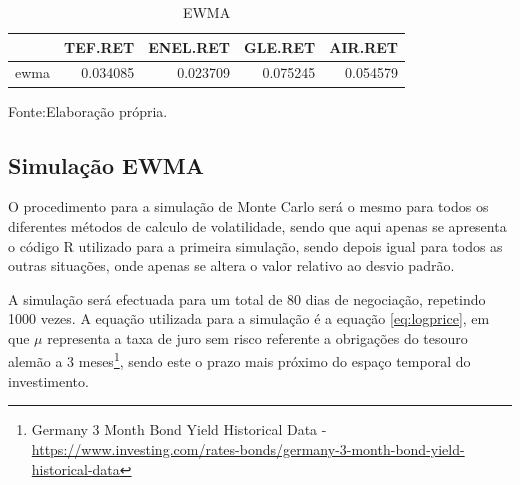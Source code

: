 \documentclass[
  12pt,
  a4paper,
  openany]{book}
\begin{document}
\begin{table}[!h]

\caption{\label{tab:ewmaval}EWMA}
\centering
\begin{tabular}[t]{lrrrr}
\toprule
  & TEF.RET & ENEL.RET & GLE.RET & AIR.RET\\
\midrule
ewma & 0.034085 & 0.023709 & 0.075245 & 0.054579\\
\bottomrule
\end{tabular}
\end{table}
\FloatBarrier
\centering

Fonte:Elaboração própria.

\justifying
\bigskip

\hypertarget{simulauxe7uxe3o-ewma}{%
\subsection{Simulação EWMA}\label{simulauxe7uxe3o-ewma}}

O procedimento para a simulação de Monte Carlo será o mesmo para todos os diferentes métodos de calculo de volatilidade, sendo que aqui apenas se apresenta o código R utilizado para a primeira simulação, sendo depois igual para todos as outras situações, onde apenas se altera o valor relativo ao desvio padrão.

A simulação será efectuada para um total de 80 dias de negociação, repetindo 1000 vezes. A equação utilizada para a simulação é a equação \eqref{eq:logprice}, em que \(\mu\) representa a taxa de juro sem risco referente a obrigações do tesouro alemão a 3 meses\footnote{Germany 3 Month Bond Yield Historical Data - \url{https://www.investing.com/rates-bonds/germany-3-month-bond-yield-historical-data}}, sendo este o prazo mais próximo do espaço temporal do investimento.

\scriptsize
\end{document}
